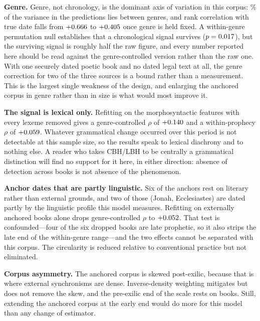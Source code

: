 \documentclass[10pt,letterpaper]{article}
\newcommand{\cbh}{CBH}
\newcommand{\lbh}{LBH}
\begin{document}
\textbf{Genre.}  Genre, not chronology, is the dominant axis of variation in
this corpus: \GNbetween\% of the variance in the predictions lies between
genres, and rank correlation with true date falls from $+0.666$ to
$+0.405$ once genre is held fixed.  A within-genre permutation null
establishes that a chronological signal survives ($p = 0.017$), but the
surviving signal is roughly half the raw figure, and every number reported here
should be read against the genre-controlled version rather than the raw one.
With one securely dated poetic book and no dated legal text at all, the genre
correction for two of the three sources is a bound rather than a measurement.
This is the largest single weakness of the design, and enlarging the anchored
corpus in genre rather than in size is what would most improve it.

\textbf{The signal is lexical only.}  Refitting on the \RTBfeat{}
morphosyntactic features with every lexeme removed gives a genre-controlled
$\rho$ of $+0.140$ and a within-prophecy $\rho$ of $+0.059$.  Whatever
grammatical change occurred over this period is not detectable at this sample
size, so the results speak to lexical diachrony and to nothing else.  A reader
who takes \cbh{}/\lbh{} to be centrally a grammatical distinction will find no
support for it here, in either direction: absence of detection across
\HBbooks{} books is not absence of the phenomenon.

\textbf{Anchor dates that are partly linguistic.}  Six of the \HBbooks{}
anchors rest on literary rather than external grounds, and two of those
(Jonah, Ecclesiastes) are dated partly by the linguistic profile this model
measures.  Refitting on externally anchored books alone drops genre-controlled
$\rho$ to $+0.052$.  That test is confounded---four of the six dropped
books are late prophetic, so it also strips the late end of the within-genre
range---and the two effects cannot be separated with this corpus.  The
circularity is reduced relative to conventional practice but not eliminated.

\textbf{Corpus asymmetry.}  The anchored corpus is skewed post-exilic, because
that is where external synchronisms are dense.  Inverse-density weighting
mitigates but does not remove the skew, and the pre-exilic end of the scale
rests on \HBnpre{} books.  Still, extending the anchored corpus at the early end would do more for this
model than any change of estimator.
\end{document}
